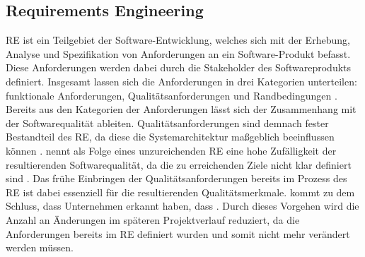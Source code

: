 \subsection{Requirements Engineering}
\ac{RE} ist ein Teilgebiet der Software-Entwicklung, welches sich mit der Erhebung, Analyse und Spezifikation von Anforderungen an ein Software-Produkt befasst.
Diese Anforderungen werden dabei durch die Stakeholder des Softwareprodukts definiert.
Insgesamt lassen sich die Anforderungen in drei Kategorien unterteilen: funktionale Anforderungen, Qualitätsanforderungen und Randbedingungen \autocite[vgl.][S. 3]{pohl_basiswissen_2021}.
\newparagraph
Bereits aus den Kategorien der Anforderungen lässt sich der Zusammenhang mit der Softwarequalität ableiten.
Qualitätsanforderungen sind demnach fester Bestandteil des \ac{RE}, da diese die Systemarchitektur maßgeblich beeinflussen können \autocite[vgl.][S. 3-4]{pohl_basiswissen_2021}.
\citeauthor{ebert_systematisches_2019} nennt als Folge eines unzureichenden \ac{RE} eine hohe Zufälligkeit der resultierenden Softwarequalität, da die zu erreichenden Ziele nicht klar definiert sind \autocite[vgl.][S. 51]{ebert_systematisches_2019}. 
\newparagraph
Das frühe Einbringen der Qualitätsanforderungen bereits im Prozess des \ac{RE} ist dabei essenziell für die resultierenden Qualitätsmerkmale.
\citeauthor{ebert_systematisches_2019} kommt zu dem Schluss, dass Unternehmen erkannt haben, dass  \autocite[S. 66]{ebert_systematisches_2019}.
Durch dieses Vorgehen wird die Anzahl an Änderungen im späteren Projektverlauf reduziert, da die Anforderungen bereits im \ac{RE} definiert wurden und somit nicht mehr verändert werden müssen.

